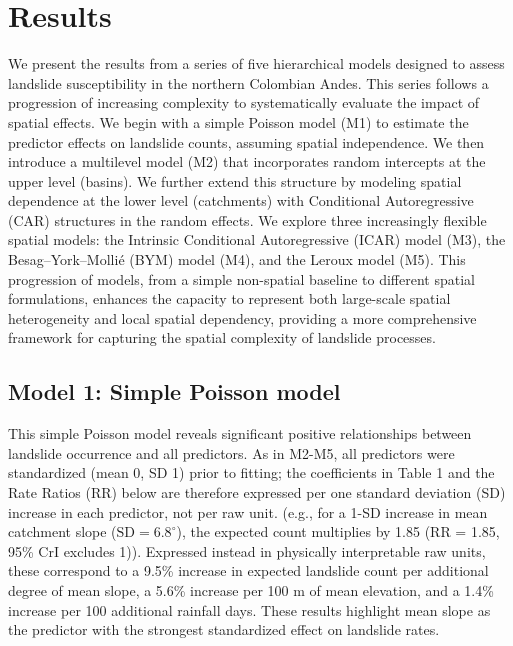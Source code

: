 \documentclass[journal abbreviation, manuscript]{copernicus}
\newcommand{\hl}[1]{#1}
\newcommand{\hlE}[1]{#1}
\begin{document}

\section{Results}\label{sec4}

We present the results from a series of five hierarchical models designed to assess landslide susceptibility in the northern Colombian Andes. 
This series follows a progression of increasing complexity to systematically evaluate the impact of spatial effects. 
We begin with a simple Poisson model (M1) to estimate the predictor effects on landslide counts, assuming spatial independence. 
We then introduce a multilevel model (M2) that incorporates random intercepts at the upper level (basins). 
We further extend this structure by modeling spatial dependence at the lower level (catchments) with Conditional Autoregressive (CAR) structures in the random effects. 
We explore three increasingly flexible spatial models: the Intrinsic Conditional Autoregressive (ICAR) model (M3), the Besag--York--Molli\'{e} (BYM) model (M4), and the Leroux model (M5). 
This progression of models, from a simple non-spatial baseline to different spatial formulations, enhances the capacity to represent both large-scale spatial heterogeneity and local spatial dependency, providing a more comprehensive framework for capturing the spatial complexity of landslide processes.

\subsection{Model 1: Simple Poisson model}\label{subsec41}

\hl{This simple Poisson model reveals significant positive relationships between landslide occurrence and all predictors. 
As in M2-M5, all predictors were standardized (mean 0, SD 1) prior to fitting; the coefficients in Table 1 and the Rate Ratios (RR) below are therefore expressed per one standard deviation (SD) increase in each predictor, not per raw unit. 
(e.g., for a 1-SD increase in mean catchment slope ($\mathrm{SD} = 6.8^{\circ}$), the expected count multiplies by 1.85 (RR = 1.85, 95\% CrI} \hlE{excludes 1))}\hl{.
Expressed instead in physically interpretable raw units, these correspond to a 9.5\% increase in expected landslide count per additional degree of mean slope, a 5.6\% increase per 100 m of mean elevation, and a 1.4\% increase per 100 additional rainfall days. 
These results highlight mean slope as the predictor with the strongest standardized effect on landslide rates.}
\end{document}
